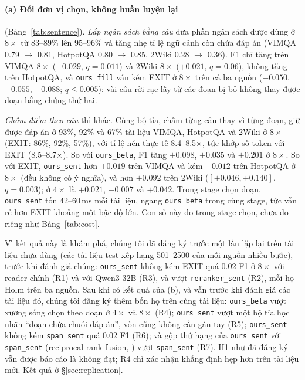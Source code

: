 \documentclass[11pt]{article}
\newcommand{\arm}[1]{\texttt{#1}}
\begin{document}
\paragraph{(a) Đổi đơn vị chọn, không huấn luyện lại} (Bảng~\ref{tab:sentence}).
\emph{Lấp ngân sách bằng câu} đưa phần ngân sách được dùng ở $8\times$ từ 83--89\% lên 95--96\% và tăng nhẹ tỉ lệ ngữ
cảnh còn chứa đáp án (VIMQA 0.79 $\to$ 0.81, HotpotQA 0.80 $\to$ 0.85, 2Wiki 0.28 $\to$ 0.36). F1 chỉ tăng trên VIMQA
$8\times$ ($+0.029$, $q=0.011$) và 2Wiki $8\times$ ($+0.021$, $q=0.06$), không tăng trên HotpotQA, và
\arm{ours\_fill} vẫn kém EXIT ở $8\times$ trên cả ba nguồn ($-0.050$, $-0.055$, $-0.088$; $q\le0.005$): vài câu rời
rạc lấy từ các đoạn bị bỏ không thay được đoạn bằng chứng thứ hai.

\emph{Chấm điểm theo câu} thì khác. Cùng bộ tỉa, chấm từng câu thay vì từng đoạn, giữ được đáp án ở 93\%, 92\% và
67\% tài liệu VIMQA, HotpotQA và 2Wiki ở $8\times$ (EXIT: 86\%, 92\%, 57\%), với tỉ lệ nén thực tế 8.4--8.5$\times$,
tức khớp số token với EXIT (8.5--8.7$\times$). So với \arm{ours\_beta}, F1 tăng $+0.098$, $+0.035$ và $+0.201$ ở
$8\times$. So với EXIT, \arm{ours\_sent} hơn $+0.019$ trên VIMQA và kém $-0.012$ trên HotpotQA ở $8\times$ (đều không có
ý nghĩa), và hơn $+0.092$ trên 2Wiki ($[+0.046, +0.140]$, $q=0.003$); ở $4\times$ là $+0.021$, $-0.007$ và $+0.042$.
Trong stage chọn đoạn, \arm{ours\_sent} tốn 42--60\,ms mỗi tài liệu, ngang \arm{ours\_beta} trong cùng stage, tức
vẫn rẻ hơn EXIT khoảng một bậc độ lớn. Con số này đo trong stage chọn, chưa đo riêng như Bảng~\ref{tab:cost}.

Vì kết quả này là khám phá, chúng tôi đã đăng ký trước một lần lặp lại trên tài liệu chưa dùng (các tài liệu test
xếp hạng 501--2500 của mỗi nguồn nhiều bước), trước khi đánh giá chúng: \arm{ours\_sent} không kém EXIT quá 0.02 F1 ở
$8\times$ với reader chính (R1) và với Qwen3-32B (R3), và vượt \arm{reranker\_sent} (R2), mỗi họ Holm trên ba nguồn.
Sau khi có kết quả của (b), và vẫn trước khi đánh giá các tài liệu đó, chúng tôi đăng ký thêm bốn họ trên cùng tài
liệu: \arm{ours\_beta} vượt xương sống chọn theo đoạn ở $4\times$ và $8\times$ (R4); \arm{ours\_sent} vượt một bộ tỉa
học nhãn ``đoạn chứa chuỗi đáp án'', vốn cũng không cần gán tay (R5); \arm{ours\_sent} không kém \arm{span\_sent} quá
0.02 F1 (R6); và gộp thứ hạng của \arm{ours\_sent} với \arm{span\_sent} (reciprocal rank fusion,
\citealp{cormack2009rrf}) vượt \arm{span\_sent} (R7). H1 như đã đăng ký vẫn được báo cáo là không đạt; R4 chỉ xác nhận
khẳng định hẹp hơn trên tài liệu mới. Kết quả ở \S\ref{sec:replication}.
\end{document}

